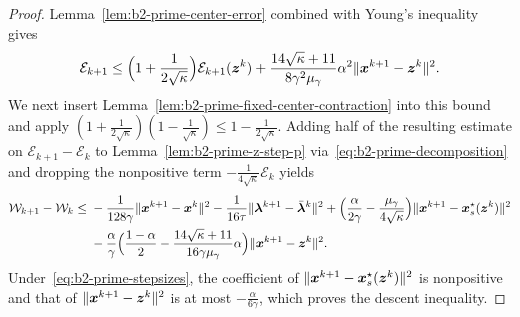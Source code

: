 \begin{proof}
Lemma~\ref{lem:b2-prime-center-error} combined with Young's inequality
gives
\[
    \mathcal E_{k+1}
    \le\Bigl(1+\frac{1}{2\sqrt{\kappa}}\Bigr)\mathcal E_{k+1}(\bm{z}^k)
    +\frac{14\sqrt{\kappa}+11}{8\gamma^2\mu_\gamma}
    \alpha^2\|\bm{x}^{k+1}-\bm{z}^k\|^2 .
\]
We next insert Lemma~\ref{lem:b2-prime-fixed-center-contraction} into this
bound and apply
\((1+\frac{1}{2\sqrt{\kappa}})(1-\frac{1}{\sqrt{\kappa}})
\le1-\frac{1}{2\sqrt{\kappa}}\). Adding half of the resulting estimate on
\(\mathcal E_{k+1}-\mathcal E_k\) to Lemma~\ref{lem:b2-prime-z-step-p}
via~\eqref{eq:b2-prime-decomposition} and dropping the nonpositive term
\(-\frac{1}{4\sqrt{\kappa}}\mathcal E_k\) yields
\[
\begin{aligned}
    \mathcal W_{k+1}-\mathcal W_k
    \le{}&-\frac{1}{128\gamma}\|\bm{x}^{k+1}-\bm{x}^k\|^2
    -\frac{1}{16\tau}\|\bm{\lambda}^{k+1}-\bar{\bm{\lambda}}^k\|^2
    +\Bigl(\frac{\alpha}{2\gamma}-\frac{\mu_\gamma}{4\sqrt{\kappa}}\Bigr)
    \|\bm{x}^{k+1}-\bm{x}_s^\star(\bm{z}^k)\|^2\\
    &-\frac{\alpha}{\gamma}
    \Bigl(\frac{1-\alpha}{2}
    -\frac{14\sqrt{\kappa}+11}{16\gamma\mu_\gamma}\alpha\Bigr)
    \|\bm{x}^{k+1}-\bm{z}^k\|^2 .
\end{aligned}
\]
Under~\eqref{eq:b2-prime-stepsizes}, the coefficient of
\(\|\bm{x}^{k+1}-\bm{x}_s^\star(\bm{z}^k)\|^2\) is nonpositive and that of
\(\|\bm{x}^{k+1}-\bm{z}^k\|^2\) is at most \(-\frac{\alpha}{6\gamma}\), which proves
the descent inequality.


\end{proof}

